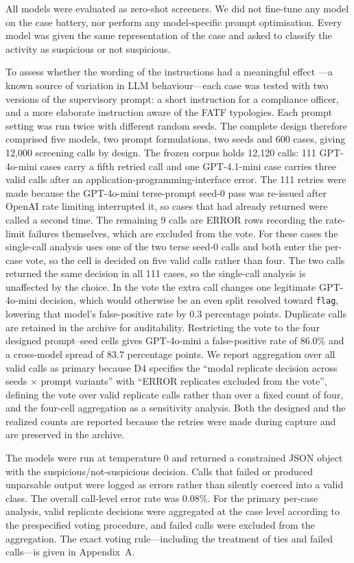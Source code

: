 \documentclass[pdflatex,sn-basic,Numbered]{sn-jnl}
\begin{document}
All models were evaluated as zero-shot screeners. We did not fine-tune any model on the case battery, nor perform any model-specific prompt optimisation. Every model was given the same representation of the case and asked to classify the activity as suspicious or not suspicious.

To assess whether the wording of the instructions had a meaningful effect \cite{promptsens}---a known source of variation in LLM behaviour---each case was tested with two versions of the supervisory prompt: a short instruction for a compliance officer, and a more elaborate instruction aware of the FATF typologies. Each prompt setting was run twice with different random seeds. The complete design therefore comprised five models, two prompt formulations, two seeds and 600 cases, giving 12{,}000 screening calls by design. The frozen corpus holds 12{,}120 calls: 111 GPT-4o-mini cases carry a fifth retried call and one GPT-4.1-mini case carries three valid calls after an application-programming-interface error. The 111 retries were made because the GPT-4o-mini terse-prompt seed-0 pass was re-issued after OpenAI rate limiting interrupted it, so cases that had already returned were called a second time. The remaining 9 calls are ERROR rows recording the rate-limit failures themselves, which are excluded from the vote. For these cases the single-call analysis uses one of the two terse seed-0 calls and both enter the per-case vote, so the cell is decided on five valid calls rather than four. The two calls returned the same decision in all 111 cases, so the single-call analysis is unaffected by the choice. In the vote the extra call changes one legitimate GPT-4o-mini decision, which would otherwise be an even split resolved toward \texttt{flag}, lowering that model's false-positive rate by 0.3 percentage points. Duplicate calls are retained in the archive for auditability. Restricting the vote to the four designed prompt--seed cells gives GPT-4o-mini a false-positive rate of 86.0\% and a cross-model spread of 83.7 percentage points. We report aggregation over all valid calls as primary because D4 specifies the ``modal replicate decision across seeds $\times$ prompt variants'' with ``ERROR replicates excluded from the vote'', defining the vote over valid replicate calls rather than over a fixed count of four, and the four-cell aggregation as a sensitivity analysis. Both the designed and the realized counts are reported because the retries were made during capture and are preserved in the archive.

The models were run at temperature 0 and returned a constrained JSON object with the suspicious/not-suspicious decision. Calls that failed or produced unparsable output were logged as errors rather than silently coerced into a valid class. The overall call-level error rate was 0.08\%. For the primary per-case analysis, valid replicate decisions were aggregated at the case level according to the prespecified voting procedure, and failed calls were excluded from the aggregation. The exact voting rule---including the treatment of ties and failed calls---is given in Appendix~A.
\end{document}
